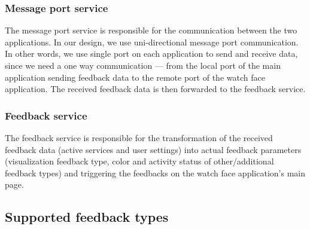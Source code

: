 \documentclass[conference, a4paper, 10pt, twocolumn]{IEEEtran}
\begin{document}
\subsubsection{Message port service}
The message port service is responsible for the communication between the two applications. In our design, we use uni-directional message port communication. In other words, we use single port on each application to send and receive data, since we need a one way communication --- from the local port of the main application sending feedback data to the remote port of the watch face application. The received feedback data is then forwarded to the feedback service.

\subsubsection{Feedback service}
The feedback service is responsible for the transformation of the received feedback data (active services and user settings) into actual feedback parameters (visualization feedback type, color and activity status of other/additional feedback types) and triggering the feedbacks on the watch face application's main page. 


\subsection{Supported feedback types}
\end{document}
